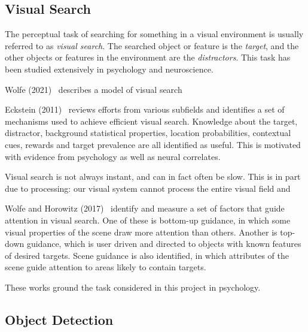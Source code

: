 
\subsection{Visual Search}
\label{sec:visualsearch}

The perceptual task of searching for something in a visual environment is usually referred to as \textit{visual search}.
The searched object or feature is the \textit{target}, and the other objects or features in the environment are the \textit{distractors}.
This task has been studied extensively in psychology and neuroscience.

Wolfe (2021)~\cite{wolfe_guided_2021} describes a model of visual search


Eckstein (2011)~\cite{eckstein_visual_2011} reviews efforts from various subfields and identifies a set of mechanisms used to achieve efficient visual search.
Knowledge about the target, distractor, background statistical properties, location probabilities, contextual cues, rewards and target prevalence are all identified as useful.
This is motivated with evidence from psychology as well as neural correlates.

Visual search is not always instant, and can in fact often be slow.
This is in part due to processing: our visual system cannot process the entire visual field and 


Wolfe and Horowitz (2017)~\cite{wolfe_horowitz_2017} identify and measure a set of factors that guide attention in visual search.
One of these is bottom-up guidance, in which some visual properties of the scene draw more attention than others.
Another is top-down guidance, which is user driven and directed to objects with known features of desired targets.
Scene guidance is also identified, in which attributes of the scene guide attention to areas likely to contain targets. 

These works ground the task considered in this project in psychology.


\subsection{Object Detection}

